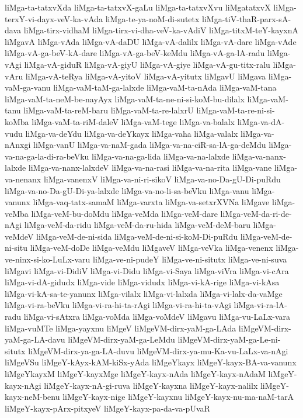 {liMga-ta-tatxvXda
liMga-ta-tatxvX-gaLu
liMga-ta-tatxvXvu
liMgatatxvX
liMga-terxY-vi-dayx-veV-ka-vAda
liMga-te-ya-noM-di-sutetx
liMga-tiV-thaR-parx-sA-dava
liMga-tirx-vidhaM
liMga-tirx-vi-dha-veV-ka-vAdiV
liMga-titxM-teY-kayxnA
liMgavA
liMga-vAda
liMga-vA-daDU
liMga-vA-dalilx
liMga-vA-dare
liMga-vAde
liMga-vA-ga-beV-kA-dare
liMga-vA-ga-beV-keMdu
liMga-vA-ga-lA-radu
liMga-vAgi
liMga-vA-giduR
liMga-vA-giyU
liMga-vA-giye
liMga-vA-gu-titx-ralu
liMga-vAru
liMga-vA-teRya
liMga-vA-yitoV
liMga-vA-yitutx
liMgavU
liMgava
liMga-vaM-ga-vanu
liMga-vaM-taM-ga-lalxde
liMga-vaM-ta-nAda
liMga-vaM-tana
liMga-vaM-ta-neM-be-nayAyx
liMga-vaM-ta-ne-ni-si-koM-bu-dilalx
liMga-vaM-tanu
liMga-vaM-ta-reM-baru
liMga-vaM-ta-re-lalxrU
liMga-vaM-ta-re-ni-si-koMba
liMga-vaM-ta-riM-daleV
liMga-vaM-tege
liMga-va-balalx
liMga-va-dA-vudu
liMga-va-deYdu
liMga-va-deYkayx
liMga-vaha
liMga-valalx
liMga-va-nAnxgi
liMga-vanU
liMga-va-naM-gada
liMga-va-na-ciR-sa-lA-ga-deMdu
liMga-va-na-ga-la-di-ra-beVku
liMga-va-na-ga-lida
liMga-va-na-lalxde
liMga-va-nanx-lalxde
liMga-va-nanx-lalxdeV
liMga-va-na-rasi
liMga-va-na-rita
liMga-vane
liMga-va-nenanx
liMga-vanenxV
liMga-va-ni-ri-sikoV
liMga-va-no-Da-gU-Di-puRdu
liMga-va-no-Da-gU-Di-ya-lalxde
liMga-va-no-li-sa-beVku
liMga-vanu
liMga-vanunx
liMga-vaq-tatx-samaM
liMga-varxta
liMga-va-setxrXVNa
liMgave
liMga-veMba
liMga-veM-bu-doMdu
liMga-veMda
liMga-veM-dare
liMga-veM-da-ri-de-nAgi
liMga-veM-da-ridu
liMga-veM-da-ru-hida
liMga-veM-deM-baru
liMga-veMdeV
liMga-veM-de-ni-sida
liMga-veM-de-ni-si-koM-Di-puRdu
liMga-veM-de-ni-situ
liMga-veM-doDe
liMga-veMdu
liMgaveV
liMga-veVka
liMga-venenx
liMga-ve-ninx-si-ko-LuLx-varu
liMga-ve-ni-pudeY
liMga-ve-ni-situtx
liMga-ve-ni-suva
liMgavi
liMga-vi-DidiV
liMga-vi-Didu
liMga-vi-Saya
liMga-viVra
liMga-vi-cAra
liMga-vi-dA-gidudx
liMga-vide
liMga-vidudx
liMga-vi-kA-rige
liMga-vi-kAsa
liMga-vi-kA-sa-te-yanunx
liMga-vilalx
liMga-vi-lalxda
liMga-vi-lalx-da-vaMge
liMga-vi-ra-beVku
liMga-vi-ra-hi-ta-rAgi
liMga-vi-ra-hi-ta-vAgi
liMga-vi-ra-lA-radu
liMga-vi-sAtxra
liMga-voMda
liMga-voMdeV
liMgavu
liMga-vu-LaLx-vara
liMga-vuMTe
liMga-yayxnu
liMgeV
liMgeVM-dirx-yaM-ga-LAda
liMgeVM-dirx-yaM-ga-LA-davu
liMgeVM-dirx-yaM-ga-LeMdu
liMgeVM-dirx-yaM-ga-Le-ni-situtx
liMgeVM-dirx-ya-ga-LA-duvu
liMgeVM-dirx-ya-mu-Ka-vu-LaLx-va-nAgi
liMgeVSu
liMgeY-kAyx-kAM-kiSx-yAda
liMgeYkayx
liMgeY-kayx-BA-va-vanunx
liMgeYkayxM
liMgeY-kayxMge
liMgeY-kayx-nAda
liMgeY-kayx-nAdaM
liMgeY-kayx-nAgi
liMgeY-kayx-nA-gi-ruva
liMgeY-kayxna
liMgeY-kayx-nalilx
liMgeY-kayx-neM-benu
liMgeY-kayx-nige
liMgeY-kayxnu
liMgeY-kayx-nu-ma-naM-tarA
liMgeY-kayx-pArx-pitxyeV
liMgeY-kayx-pa-da-va-pUvaR
}
